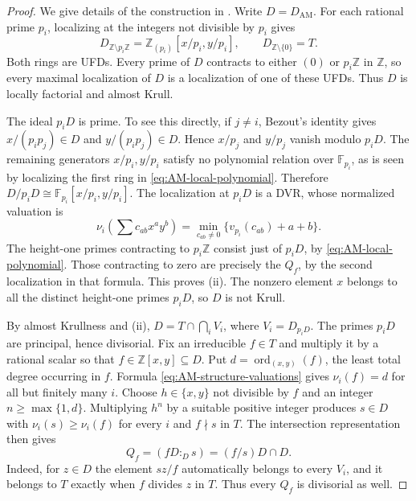 \documentclass[11pt]{amsart}
\theoremstyle{definition}
\theoremstyle{remark}
\begin{document}
\begin{proof}
We give details of the construction in \cite{ArnoldMatsuda}.  Write
$D=D_{\mathrm{AM}}$.  For each rational prime $p_i$, localizing at the
integers not divisible by $p_i$ gives
\begin{equation}\label{eq:AM-local-polynomial}
 D_{\mathbb Z\setminus p_i\mathbb Z}
   =\mathbb Z_{(p_i)}[x/p_i,y/p_i],
 \qquad D_{\mathbb Z\setminus\{0\}}=T.
\end{equation}
Both rings are UFDs.  Every prime of $D$ contracts to either $(0)$ or
$p_i\mathbb Z$ in $\mathbb Z$, so every maximal localization of $D$ is
a localization of one of these UFDs.  Thus $D$ is locally factorial and
almost Krull.

The ideal $p_iD$ is prime.  To see this directly, if $j\ne i$, Bezout's
identity gives $x/(p_ip_j)\in D$ and $y/(p_ip_j)\in D$.  Hence $x/p_j$ and $y/p_j$
vanish modulo $p_iD$.  The remaining generators $x/p_i,y/p_i$ satisfy no
polynomial relation over $\mathbb F_{p_i}$, as is seen by localizing the
first ring in \eqref{eq:AM-local-polynomial}.  Therefore
$D/p_iD\cong\mathbb F_{p_i}[x/p_i,y/p_i]$.
The localization at $p_iD$ is a DVR, whose normalized valuation is
\begin{equation}\label{eq:AM-structure-valuations}
 \nu_i\!\left(\sum c_{ab}x^ay^b\right)
       =\min_{c_{ab}\ne0}\{v_{p_i}(c_{ab})+a+b\}.
\end{equation}
The height-one primes contracting to $p_i\mathbb Z$ consist just of
$p_iD$, by \eqref{eq:AM-local-polynomial}.  Those contracting to zero
are precisely the $Q_f$, by the second localization in that formula.
This proves (ii).  The nonzero element $x$ belongs to all the distinct
height-one primes $p_iD$, so $D$ is not Krull.

By almost Krullness and (ii),
$D=T\cap\bigcap_iV_i$, where $V_i=D_{p_iD}$.
The primes $p_iD$ are principal, hence divisorial.  Fix an irreducible
$f\in T$ and multiply it by a rational scalar so that
$f\in\mathbb Z[x,y]\subseteq D$.  Put
$d=\operatorname{ord}_{(x,y)}(f)$, the least total degree occurring in $f$.
Formula \eqref{eq:AM-structure-valuations} gives $\nu_i(f)=d$ for all but
finitely many $i$.  Choose $h\in\{x,y\}$ not divisible by $f$ and an
integer $n\geq\max\{1,d\}$.  Multiplying $h^n$ by a suitable positive
integer produces $s\in D$ with
$\nu_i(s)\geq\nu_i(f)$ for every $i$ and $f\nmid s$ in $T$.
The intersection representation then gives
\begin{equation}\label{eq:AM-divisorial-colon}
 Q_f=(fD:_D s)=(f/s)D\cap D.
\end{equation}
Indeed, for $z\in D$ the element $sz/f$ automatically belongs to every
$V_i$, and it belongs to $T$ exactly when $f$ divides $z$ in $T$.
Thus every $Q_f$ is divisorial as well.


\end{proof}
\end{document}
